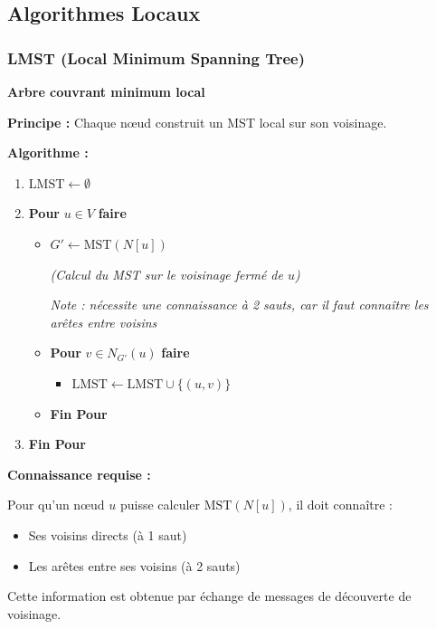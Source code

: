 \documentclass[12pt,a4paper]{article}
\begin{document}
\newpage
\subsection{Algorithmes Locaux}

\subsubsection{LMST (Local Minimum Spanning Tree)}

\begin{algorithme}
\textbf{Arbre couvrant minimum local}

\textbf{Principe :} Chaque nœud construit un MST local sur son voisinage.

\textbf{Algorithme :}
\begin{enumerate}
    \item $\text{LMST} \leftarrow \emptyset$
    \item \textbf{Pour} $u \in V$ \textbf{faire}
    \begin{itemize}
        \item $G' \leftarrow \text{MST}(N[u])$ 
        
        \textit{(Calcul du MST sur le voisinage fermé de $u$)}
        
        \textit{Note : nécessite une connaissance à 2 sauts, car il faut connaître les arêtes entre voisins}
        \item \textbf{Pour} $v \in N_{G'}(u)$ \textbf{faire}
        \begin{itemize}
            \item $\text{LMST} \leftarrow \text{LMST} \cup \{(u, v)\}$
        \end{itemize}
        \item \textbf{Fin Pour}
    \end{itemize}
    \item \textbf{Fin Pour}
\end{enumerate}
\end{algorithme}

\begin{notecours}
\textbf{Connaissance requise :}

Pour qu'un nœud $u$ puisse calculer $\text{MST}(N[u])$, il doit connaître :
\begin{itemize}
    \item Ses voisins directs (à 1 saut)
    \item Les arêtes entre ses voisins (à 2 sauts)
\end{itemize}

Cette information est obtenue par échange de messages de découverte de voisinage.
\end{notecours}
\end{document}
